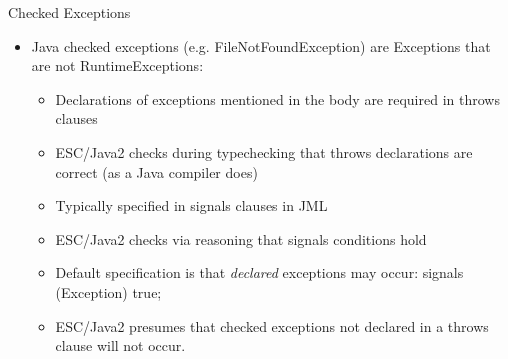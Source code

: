 \documentclass[
pdf,
nocolorBG,
slideColor,
cok,
]{prosper}
\begin{document}
\begin{slide}{Checked Exceptions}
\vspace*{-6ex}
\begin{itemize}
\item Java {\knalblue checked} exceptions (e.g. FileNotFoundException) are Exceptions that are not RuntimeExceptions:
\begin{itemize}
\item Declarations of exceptions mentioned in the body are required in throws clauses
\item ESC/Java2 checks during typechecking that throws declarations are correct (as a Java compiler does)
\item Typically specified in signals clauses in JML
\item ESC/Java2 checks via reasoning that signals conditions hold
\item Default specification is that {\it declared} exceptions may occur:  signals (Exception) true;
\item ESC/Java2 presumes that checked exceptions not declared in a throws clause will not occur.
\end{itemize}
\end{itemize}
\end{slide}
\end{document}
